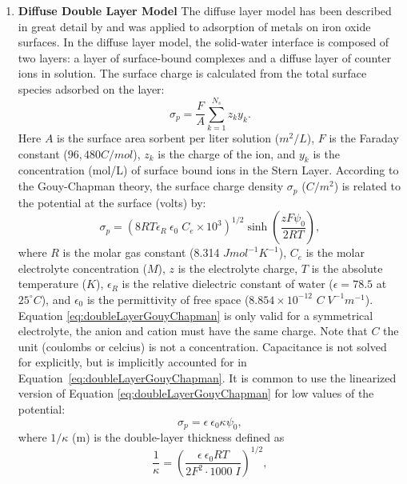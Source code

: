 \begin{enumerate}
\begin{enumerate}
\item \textbf{Diffuse Double Layer Model}
The diffuse layer model has been described in great detail by \citet{dzombak-1990} and was applied to adsorption of metals on iron oxide surfaces. In the diffuse layer model, the solid-water interface is composed of two layers: a layer of surface-bound complexes and a diffuse layer of counter ions in solution. The surface charge is calculated from the total surface species adsorbed on the layer:
\begin{equation} \label{eq:doubleLayerSurfaceChargeDensity} 
  \sigma _{p} = \frac{F}{A} \sum _{k=1}^{N_{s} } z_{k} y_{k}  .
\end{equation} 
Here $A$ is the surface area sorbent per liter solution ($m^2/L$), $F$ is the
Faraday constant ($96,480 C/mol$), $z_k$ is the charge of the ion, and $y_k$ is the concentration (mol/L) of surface bound ions in the Stern Layer.  According to the Gouy-Chapman theory, the surface charge density $\sigma_{p}$ ($C/m^2$) is related to the potential at the surface (volts) by:
\begin{equation} \label{eq:doubleLayerGouyChapman} 
  \sigma _{p}  =  (8RT\epsilon_R \ \epsilon _{0}\; C_e \times 10^{3} )^{1/2} \sinh \left(\frac{zF \psi _0 }{ 2RT}\right)  ,
\end{equation} 
where $R$ is the molar gas constant (8.314 $J mol^{-1} K^{-1}$), $C_e$
is the molar electrolyte concentration ($M$), $z$ is the electrolyte
charge, $T$ is the absolute temperature ($K$), $\epsilon_R$ is the
relative dielectric constant of water ($\epsilon = 78.5$ at
$25^{\circ}C$), and $\epsilon_{0}$ is the permittivity of free space
($8.854\times 10^{-12}$ $C\;V^{-1} m^{-1}$).  Equation
\eqref{eq:doubleLayerGouyChapman} is only valid for a symmetrical
electrolyte, the anion and cation must have the same charge.  Note
that $C$ the unit (coulombs or celcius) is not a concentration.
Capacitance is not solved for explicitly, but is implicitly accounted
for in Equation~\eqref{eq:doubleLayerGouyChapman}.  It is common to use
the linearized version of Equation \eqref{eq:doubleLayerGouyChapman} for
low values of the potential:
%
\begin{equation} \label{eq:doubleLayerLinearizedGouyChapman} 
  \sigma _{p} =\epsilon \ \epsilon _{0} \kappa \psi _{0},
\end{equation} 
where $1/\kappa$ (m) is the double-layer thickness defined as
%
\begin{equation} \label{eq:doubleLayerThickness} 
  \frac{1}{\kappa }  = \left( \frac{\epsilon \ \epsilon_{0} RT}{2 F^{2} \cdot 1000 \;I} \right)^{1/2}  ,

\end{equation}
\end{enumerate}
\end{enumerate}
